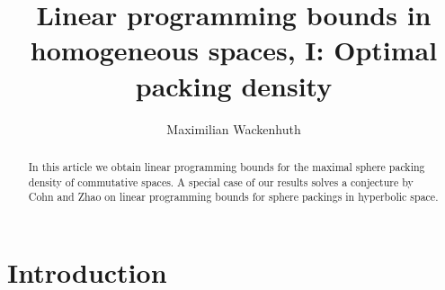 \documentclass[12pt,reqno,a4paper]{amsart}
\theoremstyle{theorem}
\theoremstyle{definition}
\numberwithin{theorem}{section}
\numberwithin{equation}{section}
\begin{document}
\title[Linear programming bounds in homogeneous spaces, I]{Linear programming bounds in homogeneous spaces, I: Optimal packing density}
\author{Maximilian Wackenhuth}
\address{Institut f\"ur Algebra und Geometrie, KIT, Karlsruhe, Germany}

\date{}

\begin{abstract}
	In this article we obtain linear programming bounds for the maximal sphere packing density of commutative spaces.
	A special case of our results solves a conjecture by Cohn and Zhao on linear programming bounds for sphere packings in hyperbolic space.
\end{abstract}


\maketitle




\section{Introduction}
\end{document}
